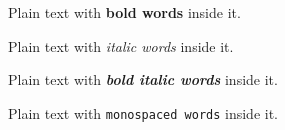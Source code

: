 \documentclass{article}
\begin{document}
Plain text with \textbf{bold words} inside it.

Plain text with \textit{italic words} inside it.

Plain text with \textbf{\textit{bold italic words}} inside it.

Plain text with \texttt{monospaced words} inside it.
\end{document}

